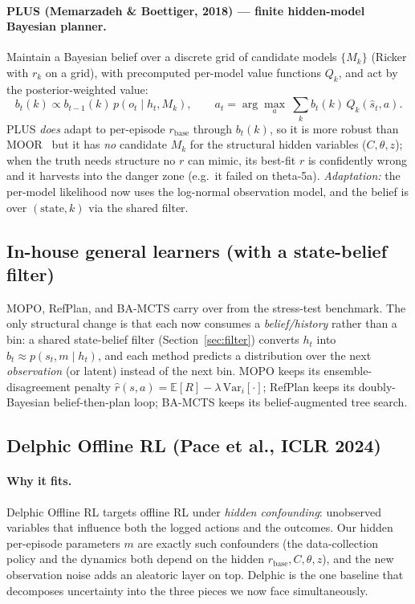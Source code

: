 \documentclass[11pt]{article}
\newcommand{\rbase}{r_{\mathrm{base}}}
\begin{document}
\paragraph{PLUS (Memarzadeh \& Boettiger, 2018) --- finite hidden-model Bayesian
planner.} Maintain a Bayesian belief over a discrete grid of candidate models
$\{M_k\}$ (Ricker with $r_k$ on a grid), with precomputed per-model value functions
$Q_k$, and act by the posterior-weighted value:
\begin{equation}
b_t(k) \propto b_{t-1}(k)\, p(o_t \mid h_t, M_k),
\qquad
a_t = \arg\max_a \ \textstyle\sum_k b_t(k)\, Q_k(\hat s_t, a).
\end{equation}
PLUS \emph{does} adapt to per-episode $\rbase$ through $b_t(k)$, so it is more
robust than MOOR \textemdash\ but it has \emph{no} candidate $M_k$ for the
structural hidden variables ($C,\theta,z$); when the truth needs structure no $r$
can mimic, its best-fit $r$ is confidently wrong and it harvests into the danger
zone (e.g.\ it failed on theta-5a). \emph{Adaptation:} the per-model likelihood now
uses the log-normal observation model, and the belief is over $(\text{state},k)$
via the shared filter.

\subsection{In-house general learners (with a state-belief filter)}
MOPO, RefPlan, and BA-MCTS carry over from the stress-test benchmark. The only
structural change is that each now consumes a \emph{belief/history} rather than a
bin: a shared state-belief filter (Section~\ref{sec:filter}) converts $h_t$ into
$b_t\approx p(s_t,m\mid h_t)$, and each method predicts a distribution over the
next \emph{observation} (or latent) instead of the next bin. MOPO keeps its
ensemble-disagreement penalty $\hat r(s,a)=\mathbb{E}[R]-\lambda\,\mathrm{Var}_i[\cdot]$;
RefPlan keeps its doubly-Bayesian belief-then-plan loop; BA-MCTS keeps its
belief-augmented tree search.

\subsection{Delphic Offline RL (Pace et al., ICLR 2024)}
\paragraph{Why it fits.} Delphic Offline RL targets offline RL under
\emph{hidden confounding}: unobserved variables that influence both the logged
actions and the outcomes. Our hidden per-episode parameters $m$ are exactly such
confounders (the data-collection policy and the dynamics both depend on the
hidden $\rbase, C, \theta, z$), and the new observation noise adds an aleatoric
layer on top. Delphic is the one baseline that decomposes uncertainty into the
three pieces we now face simultaneously.
\end{document}
